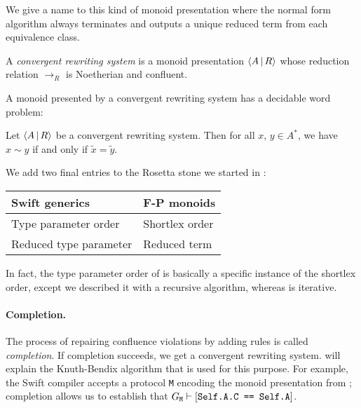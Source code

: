 \documentclass[../generics]{subfiles}
\begin{document}
We give a name to this kind of monoid presentation where the normal form algorithm always terminates and outputs a unique reduced term from each equivalence class.

\begin{definition}
A \emph{convergent rewriting system} is a monoid presentation $\langle A\,|\,R\rangle$ whose reduction relation $\rightarrow_R$ is Noetherian and confluent.
\end{definition}

A monoid presented by a convergent rewriting system has a decidable word problem:

\begin{corollary}\label{convergent decidable}
Let $\langle A\,|\,R\rangle$ be a convergent rewriting system. Then for all $x$, $y\in A^*$, we have $x\sim y$ if and only if $\tilde{x}=\tilde{y}$.
\end{corollary}

We add two final entries to the Rosetta stone we started in :
\begin{center}
\begin{tabular}{ll}
\toprule
\textbf{Swift generics}&\textbf{F-P monoids}\\
\midrule
Type parameter order&Shortlex order\\
Reduced type parameter&Reduced term\\
\bottomrule
\end{tabular}
\end{center}
In fact, the type parameter order of  is basically a specific instance of the shortlex order, except we described it with a recursive algorithm, whereas  is iterative.

\paragraph{Completion.} The process of repairing confluence violations by adding rules is called \emph{completion}. If completion succeeds, we get a convergent rewriting system.  will explain the Knuth-Bendix algorithm that is used for this purpose. For example, the Swift compiler accepts a protocol \texttt{M} encoding the monoid presentation from ; completion allows us to establish that $G_\texttt{M}\vdash[\texttt{Self.A.C == Self.A}]$.
\end{document}
